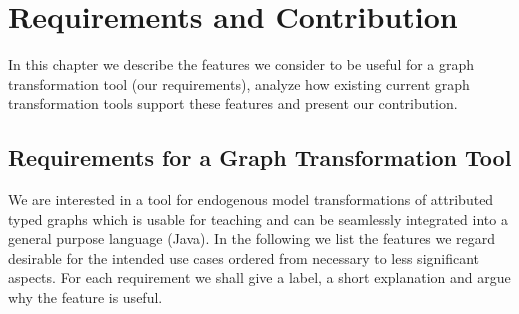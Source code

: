 \chapter{Requirements and Contribution}
\label{problem-and-contribution}
In this chapter we describe the features we consider to be useful for a graph transformation tool (our requirements), analyze how existing current graph transformation tools support these features and present our contribution.

\section{Requirements for a Graph Transformation Tool}
\label{requirements}
We are interested in a tool for endogenous model transformations of attributed typed graphs which is usable for teaching and can be seamlessly integrated into a general purpose language (Java).
In the following we list the features we regard desirable for the intended use cases ordered from necessary to less significant aspects.
For each requirement we shall give a label, a short explanation and argue why the feature is useful.

